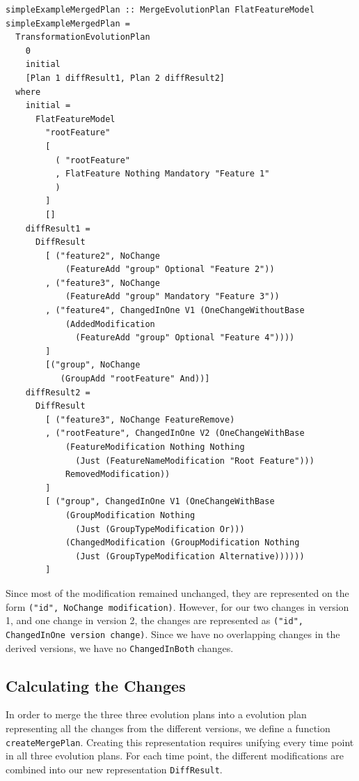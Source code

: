 \documentclass[a4paper,english]{ifimaster}
\begin{document}
\begin{verbatim}
simpleExampleMergedPlan :: MergeEvolutionPlan FlatFeatureModel
simpleExampleMergedPlan =
  TransformationEvolutionPlan
    0
    initial
    [Plan 1 diffResult1, Plan 2 diffResult2]
  where
    initial =
      FlatFeatureModel
        "rootFeature"
        [
          ( "rootFeature"
          , FlatFeature Nothing Mandatory "Feature 1"
          )
        ]
        []
    diffResult1 =
      DiffResult
        [ ("feature2", NoChange 
            (FeatureAdd "group" Optional "Feature 2"))
        , ("feature3", NoChange
            (FeatureAdd "group" Mandatory "Feature 3"))
        , ("feature4", ChangedInOne V1 (OneChangeWithoutBase 
            (AddedModification 
              (FeatureAdd "group" Optional "Feature 4"))))
        ]
        [("group", NoChange 
           (GroupAdd "rootFeature" And))]
    diffResult2 =
      DiffResult
        [ ("feature3", NoChange FeatureRemove)
        , ("rootFeature", ChangedInOne V2 (OneChangeWithBase 
            (FeatureModification Nothing Nothing 
              (Just (FeatureNameModification "Root Feature"))) 
            RemovedModification))
        ]
        [ ("group", ChangedInOne V1 (OneChangeWithBase 
            (GroupModification Nothing 
              (Just (GroupTypeModification Or))) 
            (ChangedModification (GroupModification Nothing 
              (Just (GroupTypeModification Alternative))))))
        ]
\end{verbatim}

Since most of the modification remained unchanged, they are represented on the form \texttt{("id", NoChange modification)}. However, for our two changes in version 1, and one change in version 2, the changes are represented as \texttt{("id", ChangedInOne version change)}. Since we have no overlapping changes in the derived versions, we have no \texttt{ChangedInBoth} changes.

\subsection{Calculating the Changes}%
\label{sub:calculating_the_changes}

In order to merge the three three evolution plans into a evolution plan representing all the changes from the different versions, we define a function \texttt{create\-Merge\-Plan}. Creating this representation requires unifying every time point in all three evolution plans. For each time point, the different modifications are combined into our new representation \texttt{DiffResult}. 
\end{document}
